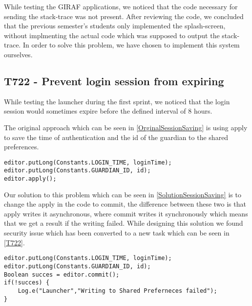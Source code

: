
While testing the GIRAF applications, we noticed that the code necessary for
sending the stack-trace was not present. After reviewing the code, we concluded
that the previous semester's students only implemented the splash-screen,
without implmenting the actual code which was supposed to output the
stack-trace. In order to solve this problem, we have chosen to implement this
system ourselves. \nl








\subsection{T722 - Prevent login session from expiring}
While testing the launcher during the first sprint, we noticed that the login
session would sometimes expire before the defined interval of 8 hours.\nl

The original approach which can be seen in \autoref{OrginalSessionSaving} is
using apply to save the time of authentication and the id of the guardian to
the shared preferences.

\begin{minipage}[H]{\linewidth}
\begin{lstlisting}[caption = Original approach to saving login session, label =
OrginalSessionSaving] 
editor.putLong(Constants.LOGIN_TIME, loginTime);
editor.putLong(Constants.GUARDIAN_ID, id);
editor.apply();
\end{lstlisting} 
\end{minipage}

Our solution to this problem which can be seen in
\autoref{SolutionSessionSaving} is to change the apply in the code to commit,
the difference between these two is that apply writes it asynchronous, where
commit writes it synchronously which means that we get a result if the writing
failed. While designing this solution we found security issue which has been
converted to a new task which can be seen in \autoref{T722}.

\begin{minipage}[H]{\linewidth}
\begin{lstlisting}[caption = Our solution to saving login session, label
=SolutionSessionSaving ] 
editor.putLong(Constants.LOGIN_TIME, loginTime);
editor.putLong(Constants.GUARDIAN_ID, id);
Boolean succes = editor.commit();
if(!succes) {
	Log.e("Launcher","Writing to Shared Preferneces failed");
}
\end{lstlisting} 
\end{minipage}

